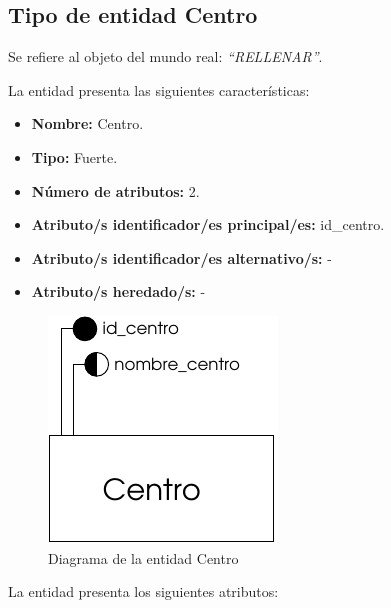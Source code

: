 \subsection{Tipo de entidad Centro}

   \begin{description}

   \item[Definición] Se refiere al objeto del mundo real: \emph{``RELLENAR''}.

   \item[Características] La entidad presenta las siguientes características:
      \begin{itemize}
         \item \textbf{Nombre:} Centro.
         \item \textbf{Tipo:} Fuerte.
         \item \textbf{Número de atributos:} 2.
         \item \textbf{Atributo/s identificador/es principal/es:} id\_centro.
         \item \textbf{Atributo/s identificador/es alternativo/s:} -
         \item \textbf{Atributo/s heredado/s:} -
      \end{itemize}

   \item[Diagrama]
   \item \begin{figure}[h!]
            \begin{center}
            \includegraphics[]{07.Modelo_Entidad-Interrelacion/7.2.Analisis_Entidades/diagramas/centro.pdf}
            \caption{Diagrama de la entidad Centro}
            \end{center}
         \end{figure}

   \item[Descripción de los atributos] La entidad presenta los siguientes
   atributos:


\end{description}
